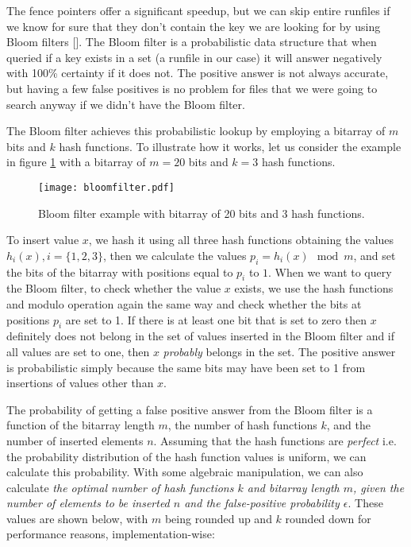The fence pointers offer a significant speedup, but we can skip entire runfiles if we know for sure that they don't contain the key we are looking for by using Bloom filters [\cite{bloom-filters}]. The Bloom filter is a probabilistic data structure that when queried if a key exists in a set (a runfile in our case) it will answer negatively with 100\% certainty if it does not. The positive answer is not always accurate, but having a few false positives is no problem for files that we were going to search anyway if we didn't have the Bloom filter.

The Bloom filter achieves this probabilistic lookup by employing a bitarray of $m$ bits and $k$ hash functions. To illustrate how it works, let us consider the example in figure \ref{fig:bloom-filter} with a bitarray of $m=20$ bits and $k=3$ hash functions.

\vspace{20px}
\begin{figure}[h]
    \centering
    \texttt{[image: bloomfilter.pdf]}
    \caption{Bloom filter example with bitarray of 20 bits and 3 hash functions.}
    \label{fig:bloom-filter}
\end{figure}
\vspace{20px}

To insert value $x$, we hash it using all three hash functions obtaining the values $h_i(x), i=\{1,2,3\}$, then we calculate the values $p_i = h_i(x)\mod{m}$, and set the bits of the bitarray with positions equal to $p_i$ to $1$. When we want to query the Bloom filter, to check whether the value $x$ exists, we use the hash functions and modulo operation again the same way and check whether the bits at positions $p_i$ are set to 1. If there is at least one bit that is set to zero then $x$ definitely does not belong in the set of values inserted in the Bloom filter and if all values are set to one, then $x$ \textit{probably} belongs in the set. The positive answer is probabilistic simply because the same bits may have been set to 1 from insertions of values other than $x$.

The probability of getting a false positive answer from the Bloom filter is a function of the bitarray length $m$, the number of hash functions $k$, and the number of inserted elements $n$. Assuming that the hash functions are \textit{perfect} i.e. the probability distribution of the hash function values is uniform, we can calculate this probability. With some algebraic manipulation, we can also calculate \textit{the optimal number of hash functions $k$ and bitarray length $m$, given the number of elements to be inserted $n$ and the false-positive probability $\epsilon$}. These values are shown below, with $m$ being rounded up and $k$ rounded down for performance reasons, implementation-wise:


